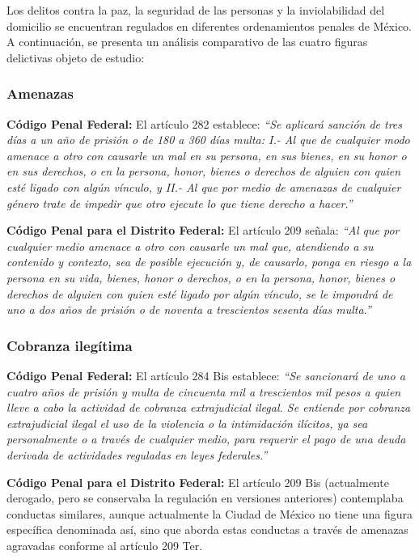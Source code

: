 \documentclass[12pt,letterpaper]{article}
\begin{document}
Los delitos contra la paz, la seguridad de las personas y la inviolabilidad del domicilio se encuentran regulados en diferentes ordenamientos penales de México. A continuación, se presenta un análisis comparativo de las cuatro figuras delictivas objeto de estudio:

\subsubsection{Amenazas}

\textbf{Código Penal Federal:} El artículo 282 establece: \emph{``Se aplicará sanción de tres días a un año de prisión o de 180 a 360 días multa: I.- Al que de cualquier modo amenace a otro con causarle un mal en su persona, en sus bienes, en su honor o en sus derechos, o en la persona, honor, bienes o derechos de alguien con quien esté ligado con algún vínculo, y II.- Al que por medio de amenazas de cualquier género trate de impedir que otro ejecute lo que tiene derecho a hacer.''}

\textbf{Código Penal para el Distrito Federal:} El artículo 209 señala: \emph{``Al que por cualquier medio amenace a otro con causarle un mal que, atendiendo a su contenido y contexto, sea de posible ejecución y, de causarlo, ponga en riesgo a la persona en su vida, bienes, honor o derechos, o en la persona, honor, bienes o derechos de alguien con quien esté ligado por algún vínculo, se le impondrá de uno a dos años de prisión o de noventa a trescientos sesenta días multa.''}

\subsubsection{Cobranza ilegítima}

\textbf{Código Penal Federal:} El artículo 284 Bis establece: \emph{``Se sancionará de uno a cuatro años de prisión y multa de cincuenta mil a trescientos mil pesos a quien lleve a cabo la actividad de cobranza extrajudicial ilegal. Se entiende por cobranza extrajudicial ilegal el uso de la violencia o la intimidación ilícitos, ya sea personalmente o a través de cualquier medio, para requerir el pago de una deuda derivada de actividades reguladas en leyes federales.''}

\textbf{Código Penal para el Distrito Federal:} El artículo 209 Bis (actualmente derogado, pero se conservaba la regulación en versiones anteriores) contemplaba conductas similares, aunque actualmente la Ciudad de México no tiene una figura específica denominada así, sino que aborda estas conductas a través de amenazas agravadas conforme al artículo 209 Ter.
\end{document}
